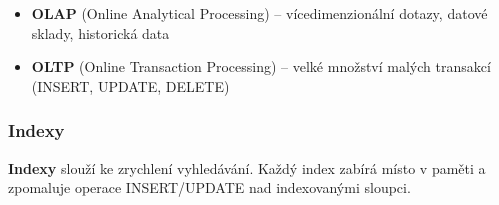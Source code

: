 \begin{itemize}
  \item \textbf{OLAP} (Online Analytical Processing) -- vícedimenzionální dotazy, datové sklady, historická data
  \item \textbf{OLTP} (Online Transaction Processing) -- velké množství malých transakcí (INSERT, UPDATE, DELETE)
\end{itemize}

\subsubsection{Indexy}

\textbf{Indexy} slouží ke zrychlení vyhledávání. Každý index zabírá místo v paměti a zpomaluje
operace INSERT/UPDATE nad indexovanými sloupci.

